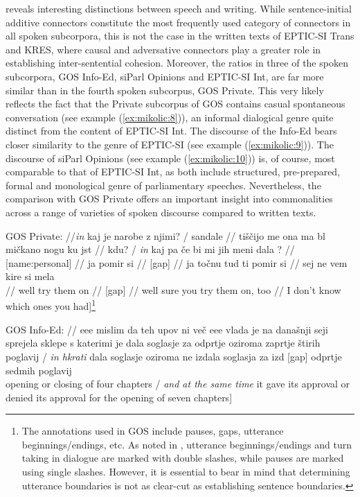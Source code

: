 \documentclass[output=paper]{langscibook}
\begin{document}
 reveals interesting distinctions between speech and writing. While sentence-initial additive connectors constitute the most frequently used category of connectors in all spoken subcorpora, this is not the case in the written texts of EPTIC-SI Trans and KRES, where causal and adversative connectors play a greater role in establishing inter-sentential cohesion. Moreover, the ratios in three of the spoken subcorpora, GOS Info-Ed, siParl Opinions and EPTIC-SI Int, are far more similar than in the fourth spoken subcorpus, GOS Private. This very likely reflects the fact that the Private subcorpus of GOS contains casual spontaneous conversation (see example (\ref{ex:mikolic:8})), an informal dialogical genre quite distinct from the content of EPTIC-SI Int. The discourse of the Info-Ed bears closer similarity to the genre of EPTIC-SI (see example (\ref{ex:mikolic:9})). The discourse of siParl Opinions (see example (\ref{ex:mikolic:10})) is, of course, most comparable to that of EPTIC-SI Int, as both include structured, pre-prepared, formal and monological genre of parliamentary speeches. Nevertheless, the comparison with GOS Private offers an important insight into commonalities across a range of varieties of spoken discourse compared to written texts.

\ea\label{ex:mikolic:8}
GOS Private: //\textit{in} kaj je narobe z njimi? / sandale // tiščijo me ona ma bl mičkano nogu ku jst // kdu? / \textit{in} kaj pa če bi mi jih meni dala ? // [name:personal] // ja pomir si // [gap] // ja točnu tud ti pomir si // sej ne vem kire si mela \\
\glt [//\textit{and} what’s wrong with them?/ sandals // they are too tight her feet are smaller than mine // who? / \textit{and} what if you gave them me to me? // [name:personal] // well try them on // [gap] // well sure you try them on, too // I don’t know which ones you had]\footnote{The annotations used in GOS include pauses, gaps, utterance beginnings/endings, etc. As noted in , utterance beginnings/endings and turn taking in dialogue are marked with double slashes, while pauses are marked using single slashes. However, it is essential to bear in mind that determining utterance boundaries is not as clear-cut as establishing sentence boundaries.}
\z

\ea\label{ex:mikolic:9}
GOS Info-Ed: // eee mislim da teh upov ni več eee vlada je na današnji seji sprejela sklepe s katerimi je dala soglasje za odprtje oziroma zaprtje štirih poglavij / \textit{in hkrati} dala soglasje oziroma ne izdala soglasja za izd [gap] odprtje sedmih poglavij \\
\glt [// erm I think that these hopes are long gone erm in today’s cabinet meeting the government has passed agreements with which it gave its approval for the ope [gap] opening or closing of four chapters / \textit{and at the same time} it gave its approval or denied its approval for the opening of seven chapters]
\z
\end{document}
